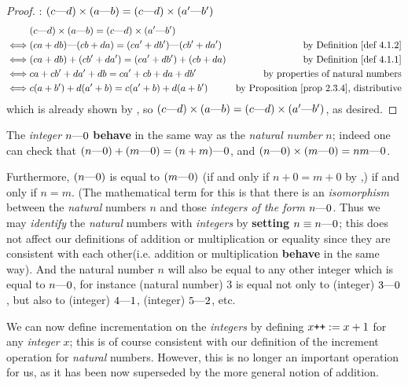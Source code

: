 \begin{proof}
: \((c \text{---} d) \times (a \text{---} b) = (c \text{---} d) \times (a' \text{---} b')\)
\begin{align*}
         & (c \M d) \X (a \M b) = (c \M d) \X (a' \M b')\\
    \iff & (ca + db) \M (cb + da) = (ca' + db') \M (cb' + da') & \text{by \DEF{4.1.2}} \\
    \iff & (ca + db) + (cb' + da') = (ca' + db') + (cb + da) & \text{by \DEF{4.1.1}} \\
    \iff & ca + cb' + da' + db = ca' + cb + da + db' & \text{by properties of natural numbers} \\
    \iff & c(a + b') + d(a' + b) = c(a' + b) + d(a + b') & \text{by \PROP{2.3.4}, distributive}
\end{align*}
which is already shown by , so \((c \text{---} d) \times (a \text{---} b) = (c \text{---} d) \times (a' \text{---} b')\), as desired.
\end{proof}

\begin{note}
The \emph{integer} \(n \text{---} 0\) \textbf{behave} in the same way as the \emph{natural number} \(n\);
indeed one can check that \((n \text{---} 0) + (m \text{---} 0) = (n + m) \text{---} 0\), and \( (n \text{---} 0) \times (m \text{---} 0) = nm \text{---}0\).
\end{note}

\begin{note}
Furthermore, \((n \text{---} 0)\) is equal to \((m \text{---} 0)\) (if and only if \(n + 0 = m + 0\) by ,) if and only if \(n = m\).
(The mathematical term for this is that there is an \emph{isomorphism} between the \emph{natural} numbers \(n\) and those \emph{integers of the form} \(n \text{---} 0\).
Thus we may \emph{identify} the \emph{natural} numbers with \emph{integers} by \textbf{setting \(n \equiv n \text{---} 0\)}; this does not affect our definitions of addition or multiplication or equality since they are consistent with each other(i.e. addition or multiplication \textbf{behave} in the same way).
And the natural number \(n\) will also be equal to any other integer which is equal to \(n \text{---} 0\),
for instance (natural number) \(3\) is equal not only to (integer) \(3 \text{---} 0\), but also to (integer) \(4 \text{---} 1\), (integer) \(5 \text{---} 2\), etc.
\end{note}

\begin{note}
We can now define incrementation on the \emph{integers} by defining \(x\texttt{++} := x+1\) for any \emph{integer} \(x\);
this is of course consistent with our definition of the increment operation for \emph{natural} numbers.
However, this is no longer an important operation for us, as it has been now superseded by the more general notion of addition.
\end{note}

